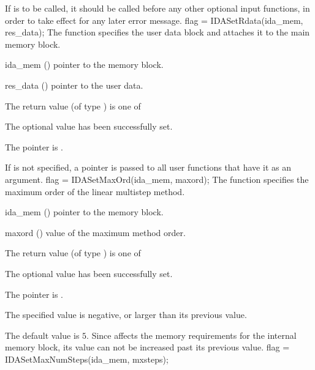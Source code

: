 {{  {\warn} If  is to be called, it should be called before any
  other optional input functions, in order to take effect for any later error
  message.
}
{
  flag = IDASetRdata(ida\_mem, res\_data);
}
{
  The function  specifies the user data block 
  and attaches it to the main {\ida} memory block.
}
{
  \begin{args}
  \item[ida\_mem] ()
    pointer to the {\ida} memory block.
  \item[res\_data] ()
    pointer to the user data.
  \end{args}
}
{
  The return value  (of type ) is one of
  \begin{args}
  \item[\Id{IDA\_SUCCESS}] 
    The optional value has been successfully set.
  \item[\Id{IDA\_MEM\_NULL}]
    The  pointer is .
  \end{args}
}
{
  If  is not specified, a  pointer is
  passed to all user functions that have it as an argument.
}
{
flag = IDASetMaxOrd(ida\_mem, maxord);
}
{
  The function  specifies the maximum order of the 
  linear multistep method.
}
{
  \begin{args}
  \item[ida\_mem] ()
    pointer to the {\ida} memory block.
  \item[maxord] ()
    value of the maximum method order.
  \end{args}
}
{
  The return value  (of type ) is one of
  \begin{args}
  \item[\Id{IDA\_SUCCESS}] 
    The optional value has been successfully set.
  \item[\Id{IDA\_MEM\_NULL}]
    The  pointer is .
  \item[\Id{IDA\_ILL\_INPUT}]
    The specified value  is negative, or larger than 
    its previous value.
  \end{args}
}
{
  The default value is $5$.
  Since  affects the memory requirements
  for the internal {\ida} memory block, its value
  can not be increased past its previous value.
}
{
flag = IDASetMaxNumSteps(ida\_mem, mxsteps);
}}
